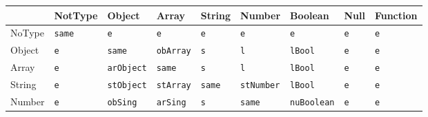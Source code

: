 \begin{table}[H]
    \begin{tabular}{|l|l|l|l|l|l|l|l|l|}
    \hline
    \cellcolor[HTML]{000000} &                             NotType &                              Object &                               Array &                              String &                              Number &                             Boolean &                                Null &                            Function \\ \hline
    NoType                   & \cellcolor[HTML]{C0C0C0}\verb|same| &                            \verb|e| &                            \verb|e| &                            \verb|e| &                            \verb|e| &                            \verb|e| &                            \verb|e| &                            \verb|e| \\ \hline
    Object                   &                            \verb|e| & \cellcolor[HTML]{C0C0C0}\verb|same| &                      \verb|obArray| &                            \verb|s| &                            \verb|l| &                        \verb|lBool| &                            \verb|e| &                            \verb|e| \\ \hline
    Array                    &                            \verb|e| &                     \verb|arObject| & \cellcolor[HTML]{C0C0C0}\verb|same| &                            \verb|s| &                            \verb|l| &                        \verb|lBool| &                            \verb|e| &                            \verb|e| \\ \hline
    String                   &                            \verb|e| &                     \verb|stObject| &                      \verb|stArray| & \cellcolor[HTML]{C0C0C0}\verb|same| &                     \verb|stNumber| &                        \verb|lBool| &                            \verb|e| &                            \verb|e| \\ \hline
    Number                   &                            \verb|e| &                       \verb|obSing| &                       \verb|arSing| &                            \verb|s| & \cellcolor[HTML]{C0C0C0}\verb|same| &                    \verb|nuBoolean| &                            \verb|e| &                            \verb|e| \\ \hline

\end{tabular}
\end{table}

